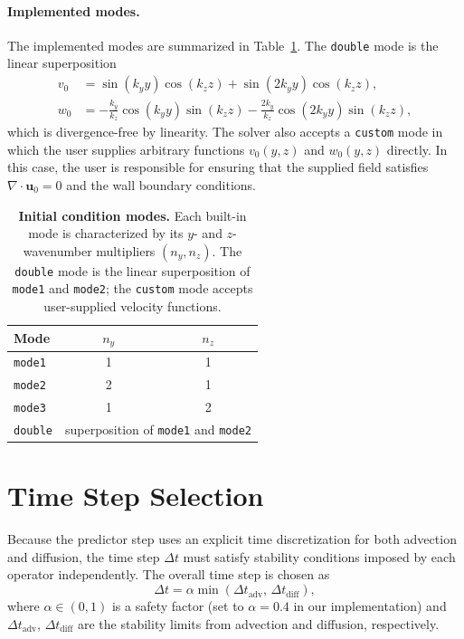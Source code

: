 \paragraph{Implemented modes.}
The implemented modes are summarized in Table~\ref{tab:icmodes}. The \texttt{double} mode is the linear superposition
\begin{align}
    v_0 &= \sin(k_y y)\cos(k_z z) + \sin(2k_y y)\cos(k_z z), \\
    w_0 &= -\frac{k_y}{k_z}\cos(k_y y)\sin(k_z z)
           -\frac{2k_y}{k_z}\cos(2k_y y)\sin(k_z z),
\end{align}
which is divergence-free by linearity. The solver also accepts a
\texttt{custom} mode in which the user supplies arbitrary functions
$v_0(y,z)$ and $w_0(y,z)$ directly. In this case, the user is
responsible for ensuring that the supplied field satisfies
$\nabla\cdot\mathbf{u}_0 = 0$ and the wall boundary conditions.

\begin{table}[h]
\begin{center}
\begin{tabular}{l c c}
    \hline
    \textbf{Mode} & $n_y$ & $n_z$ \\
    \hline\hline
    \texttt{mode1}  & 1 & 1 \\
    \texttt{mode2}  & 2 & 1 \\
    \texttt{mode3}  & 1 & 2 \\
    \texttt{double} & \multicolumn{2}{c}{superposition of \texttt{mode1} and \texttt{mode2}} \\
    \hline
\end{tabular}
\caption[Initial condition modes]{\textbf{Initial condition modes.} Each built-in mode is
characterized by its $y$- and $z$-wavenumber multipliers $(n_y, n_z)$.
The \texttt{double} mode is the linear superposition of \texttt{mode1}
and \texttt{mode2}; the \texttt{custom} mode accepts user-supplied
velocity functions.}
\label{tab:icmodes}
\end{center}
\end{table}

\section{Time Step Selection}

Because the predictor step uses an explicit time discretization for both advection and diffusion, the time step $\Delta t$ must satisfy stability conditions imposed by each operator independently. The overall time step is chosen as
\begin{equation}
    \Delta t = \alpha \min\!\left(\Delta t_{\mathrm{adv}},\,
    \Delta t_{\mathrm{diff}}\right),
    \label{eq:dt}
\end{equation}
where $\alpha \in (0,1)$ is a safety factor (set to $\alpha = 0.4$ in our implementation) and $\Delta t_{\mathrm{adv}}$, $\Delta t_{\mathrm{diff}}$ are the stability limits from advection and diffusion, respectively.

